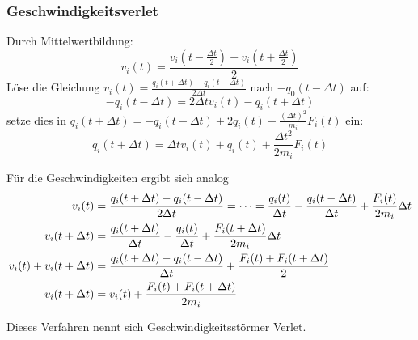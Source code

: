 \documentclass[]{article}
\begin{document}
\subsubsection*{Geschwindigkeitsverlet}
Durch Mittelwertbildung: 
\begin{equation*}
v_i(t) = \frac{v_i \left(t - \frac{\Delta t}{2} \right) + v_i \left(t+ \frac{\Delta t}{2} \right)}{2}
\end{equation*}
Löse die Gleichung $v_{i} (t) =  \frac{q_i(t+ \Delta t) - q_i (t - \Delta t)}{2 \Delta t}$ nach $-q_0(t-\Delta t)$ auf: 
\begin{equation*}
- q_i(t - \Delta t) = 2 \Delta t v_i(t) - q_i (t + \Delta t)
\end{equation*}
setze dies in $q_i (t + \Delta t) = - q_i(t - \Delta t) + 2 q_i (t) + \frac{(\Delta t)^2}{m_i} F_i(t)$ ein:
\begin{equation}
q_i (t + \Delta t) = \Delta t v_i (t) + q_i(t) + \frac{\Delta t^2}{2 m_i} F_i(t) \label{VL30_1}
\end{equation}

Für die Geschwindigkeiten ergibt sich analog
\begin{align}
v_i(t) &= \frac{q_i(t + \Delta t) - q_i(t - \Delta t)}{2 \Delta t} = \dots = \frac{q_i(t)}{\Delta t} - \frac{q_i(t - \Delta t)}{\Delta t} + \frac{F_i(t)}{2 m_i} \Delta t \notag \\
v_i(t + \Delta t) &= \frac{q_i(t + \Delta t)}{\Delta t} - \frac{q_i(t)}{\Delta t} + \frac{F_i(t + \Delta t)}{2 m_i} \Delta t \notag \\
v_i(t) + v_i(t+ \Delta t) &= \frac{q_i(t + \Delta t) - q_i(t - \Delta t)}{\Delta t} + \frac{F_i(t) + F_i(t + \Delta t)}{2} \notag \\
v_i(t+\Delta t) &= v_i(t) + \frac{F_i(t) + F_i(t + \Delta t)}{2 m_i} \label{VL30_2}
\end{align}

Dieses Verfahren nennt sich Geschwindigkeitsstörmer Verlet. 
\end{document}
